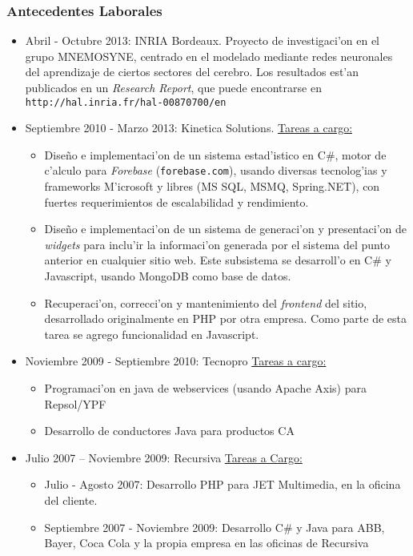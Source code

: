 \subsubsection*{Antecedentes Laborales}
\begin{itemize}
	\item Abril - Octubre 2013: INRIA Bordeaux.
		\subitem Proyecto de investigaci'on en el grupo MNEMOSYNE, centrado en el modelado mediante
		redes neuronales del aprendizaje de ciertos sectores del cerebro.  Los resultados est'an
		publicados en un \emph{Research Report}, que puede encontrarse en
		\texttt{http://hal.inria.fr/hal-00870700/en}
	\item Septiembre 2010 - Marzo 2013: Kinetica Solutions.
		\subitem \underline{Tareas a cargo:}
		\begin{itemize}
			\item Dise\~no e implementaci'on de un sistema estad'istico en C\#,
				motor de c'alculo para \emph{Forebase} (\texttt{forebase.com}), usando
				diversas tecnolog'ias y frameworks M'icrosoft y libres (MS SQL, MSMQ,
				Spring.NET), con fuertes requerimientos de escalabilidad y rendimiento.
			\item Dise\~no e implementaci'on de un sistema de generaci'on y presentaci'on
				de \emph{widgets} para inclu'ir la informaci'on generada por el sistema del
				punto anterior en cualquier sitio web.  Este subsistema se desarroll'o en C\# y
				Javascript, usando MongoDB como base de datos.
			\item Recuperaci'on, correcci'on y mantenimiento del \emph{frontend} del sitio,
				desarrollado originalmente en PHP por otra empresa.  Como parte de esta tarea se
				agrego funcionalidad en Javascript.
		\end{itemize}
	\item Noviembre 2009 - Septiembre 2010: Tecnopro
		\subitem \underline{Tareas a cargo:}
		\begin{itemize}
			\item Programaci'on en java de webservices (usando Apache Axis) para Repsol/YPF
			\item Desarrollo de conductores Java para productos CA
		\end{itemize}
	\item Julio 2007 -- Noviembre 2009: Recursiva
		\subitem \underline{Tareas a Cargo:}
			\begin{itemize}
				\item Julio - Agosto 2007: Desarrollo PHP para JET Multimedia,
					en la oficina del cliente.
				\item Septiembre 2007 - Noviembre 2009: Desarrollo C\# y Java para ABB,
					Bayer, Coca Cola y la propia empresa en las oficinas de
					Recursiva
			\end{itemize}


\end{itemize}

